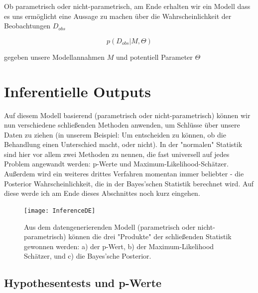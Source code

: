\documentclass[a4paper,twoside]{tufte-book}\usepackage[]{graphicx}\usepackage[]{color}
\begin{document}
Ob parametrisch oder nicht-parametrisch, am Ende erhalten wir ein Modell dass es uns ermöglicht eine Aussage zu machen über die Wahrscheinlichkeit der Beobachtungen $D_{obs}$

\begin{equation}
p(D_{obs} | M, \Theta)
\end{equation}

gegeben unsere Modellannahmen $M$ und potentiell Parameter $\Theta$


\section{Inferentielle Outputs}

Auf diesem Modell basierend (parametrisch oder nicht-parametrisch) können wir nun verschiedene schließenden Methoden anwenden, um Schlüsse über unsere Daten zu ziehen (in unserem Beispiel: Um entscheiden zu können, ob die Behandlung einen Unterschied macht, oder nicht). In der "normalen" Statistik sind hier vor allem zwei Methoden zu nennen, die fast universell auf jedes Problem angewandt werden: p-Werte und Maximum-Likelihood-Schätzer. Außerdem wird ein weiteres drittes Verfahren momentan immer beliebter - die Posterior Wahrscheinlichkeit, die in der Bayes'schen Statistik berechnet wird. Auf diese werde ich am Ende dieses Abschnittes noch kurz eingehen.

\begin{figure}[htb]
\begin{center}
\texttt{[image: InferenceDE]}
\caption{Aus dem datengenerierenden Modell (parametrisch oder nicht-parametrisch) können die drei "Produkte" der schließenden Statistik gewonnen werden: a) der p-Wert, b) der Maximum-Likelihood Schätzer, und c) die Bayes'sche Posterior.}
\label{fig: InferenceMethods}
\end{center}
\end{figure}


\subsection{Hypothesentests und p-Werte}\label{ch: p-werte}
\end{document}
